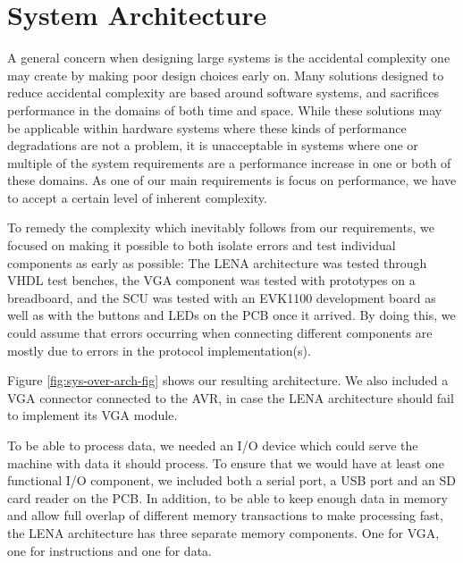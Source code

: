 \section{System Architecture}

A general concern when designing large systems is the accidental
complexity\cite[p.~8-9]{holt2004uml} one may create by making poor design choices early
on. Many solutions designed to reduce accidental complexity are based around
software systems, and sacrifices performance in the domains of both time and
space\cite{moseley2006out}. While these solutions may be applicable
within hardware systems where these kinds of performance degradations are not a
problem, it is unacceptable in systems where one or multiple of the system
requirements are a performance increase in one or both of these domains. As one
of our main requirements is focus on performance, we have to accept a certain
level of inherent complexity.


To remedy the complexity which inevitably follows from our requirements, we
focused on making it possible to both isolate errors and test
individual components as early as possible: The \ac{LENA} architecture was
tested through \ac{VHDL} test benches, the \ac{VGA} component was tested with
prototypes on a breadboard, and the \ac{SCU} was tested with an EVK1100 development
board as well as with the buttons and \ac{LED}s on the PCB once it arrived.
By doing this, we could assume that errors occurring when connecting different
components are mostly due to errors in the protocol implementation(s).

Figure \ref{fig:sys-over-arch-fig} shows our resulting architecture. We also included a
\ac{VGA} connector connected to the AVR, in case the \ac{LENA} architecture
should fail to implement its \ac{VGA} module.

To be able to process data, we needed an \ac{I/O} device which could serve the machine
with data it should process. To ensure that we would have at least one
functional \ac{I/O} component, we included both a serial
port, a \ac{USB} port and an \ac{SD} card reader on the \ac{PCB}. In addition,
to be able to keep enough data in memory and allow full overlap of different memory
transactions to make processing fast, the \ac{LENA} architecture has three separate
memory components. One for \ac{VGA}, one for instructions and one for data.
